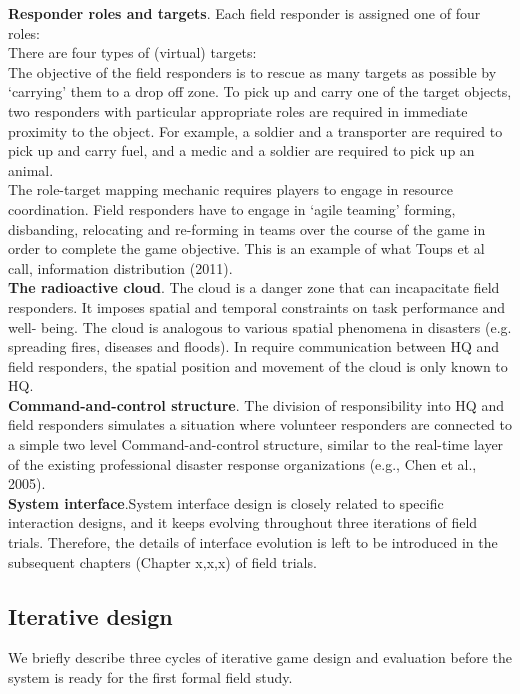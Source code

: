 \textbf{Responder roles and targets}. Each field responder is assigned one of four roles:\\

There are four types of (virtual) targets:\\

The objective of the field responders is to rescue as many targets as possible by `carrying' them to a drop off zone. To pick up and carry one of the target objects, two responders with particular appropriate roles are required in immediate proximity to the object. For example, a soldier and a transporter are required to pick up and carry fuel, and a medic and a soldier are required to pick up an animal.\\

The role-target mapping mechanic requires players to engage in resource coordination. Field responders have to engage in `agile teaming' forming, disbanding, relocating and re-forming in teams over the course of the game in order to complete the game objective. This is an example of what Toups et al call, information distribution (2011).\\

\textbf{The radioactive cloud}. The cloud is a danger zone that can incapacitate field responders. It imposes spatial and temporal constraints on task performance and well- being. The cloud is analogous to various spatial phenomena in disasters (e.g. spreading fires, diseases and floods). In require communication between HQ and field responders, the spatial position and movement of the cloud is only known to HQ. \\

\textbf{Command-and-control structure}. The division of responsibility into HQ and field responders simulates a situation where volunteer responders are connected to a simple two level Command-and-control structure, similar to the real-time layer of the existing professional disaster response organizations (e.g., Chen et al., 2005).\\

\textbf{System interface}.System interface design is closely related to specific interaction designs, and it keeps evolving throughout three iterations of field trials. Therefore, the details of interface evolution is left to be introduced in the subsequent chapters (Chapter x,x,x) of field trials. \\

\subsection{Iterative design}
We briefly describe three cycles of iterative game design and evaluation before the system is ready for the first formal field study.\\

